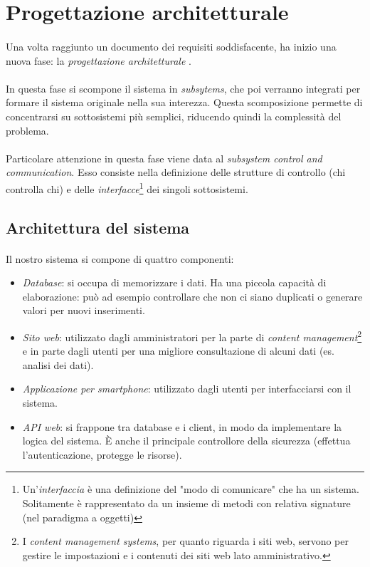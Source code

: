 \documentclass[11pt,a4paper,english]{article}
\begin{document}
\newpage
\section{Progettazione architetturale}

\paragraph{} Una volta raggiunto un documento dei requisiti soddisfacente, ha inizio una nuova fase: la \emph{progettazione architetturale} \cite{prog_architetturale}. 

\paragraph{} In questa fase si scompone il sistema in \emph{subsytems}, che poi verranno integrati per formare il sistema originale nella sua interezza. Questa scomposizione permette di concentrarsi su sottosistemi più semplici, riducendo quindi la complessità del problema. 

\paragraph{} Particolare attenzione in questa fase viene data al \emph{subsystem control and communication}. Esso consiste nella definizione delle strutture di controllo (chi controlla chi) e delle \emph{interfacce}\footnote{Un'\emph{interfaccia} è una definizione del "modo di comunicare" che ha un sistema. Solitamente è rappresentato da un insieme di metodi con relativa signature (nel paradigma a oggetti)} dei singoli sottosistemi.

\subsection{Architettura del sistema}

\paragraph{} Il nostro sistema si compone di quattro componenti:
\begin{itemize}
    \item \emph{Database}: si occupa di memorizzare i dati. Ha una piccola capacità di elaborazione: può ad esempio controllare che non ci siano duplicati o generare valori per nuovi inserimenti.
    \item \emph{Sito web}: utilizzato dagli amministratori per la parte di \emph{content management}\footnote{I \emph{content management systems}, per quanto riguarda i siti web, servono per gestire le impostazioni e i contenuti dei siti web lato amministrativo.} e in parte dagli utenti per una migliore consultazione di alcuni dati (es. analisi dei dati).
    \item \emph{Applicazione per smartphone}: utilizzato dagli utenti per interfacciarsi con il sistema.
    \item \emph{API web}: si frappone tra database e i client, in modo da implementare la logica del sistema. È anche il principale controllore della sicurezza (effettua l'autenticazione, protegge le risorse). 
\end{itemize}
\end{document}

